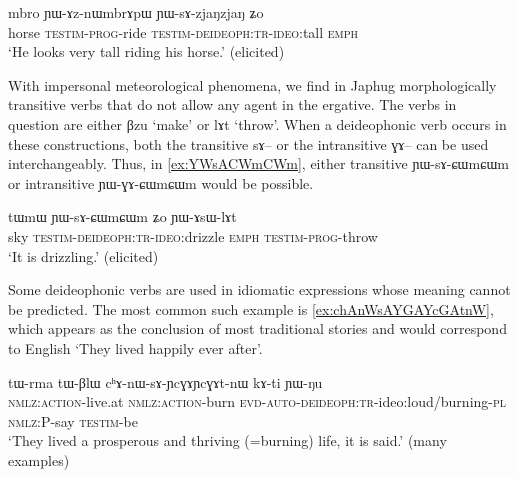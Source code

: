 \documentclass[oldfontcommands,oneside,a4paper,11pt]{article}
\newcommand{\ipa}[1]{{\phon \mbox{#1}}} %
\begin{document}
     \begin{exe}
     \ex \label{ex:YWsAzjaNzjaN2}
\gll
\ipa{mbro} 		\ipa{ɲɯ-ɤz-nɯmbrɤpɯ} \ipa{ɲɯ-sɤ-zjaŋzjaŋ} 	\ipa{ʑo} \\
horse  \textsc{testim-prog}-ride \textsc{testim-deideoph:tr-ideo}:tall \textsc{emph}\\
\glt `He looks very tall riding his horse.' (elicited)
\end{exe}

With impersonal meteorological phenomena, we find in Japhug morphologically transitive verbs that do not allow any agent in the ergative. The verbs in question are either \ipa{βzu} `make' or \ipa{lɤt} `throw'. When a deideophonic verb occurs in these constructions, both the transitive \ipa{sɤ--} or the intransitive \ipa{ɣɤ--} can be used interchangeably. Thus, in \ref{ex:YWsACWmCWm}, either transitive	\ipa{ɲɯ-sɤ-ɕɯmɕɯm} or 	intransitive \ipa{ɲɯ-ɣɤ-ɕɯmɕɯm} would be possible.

     \begin{exe}
     \ex \label{ex:YWsACWmCWm}
\gll
\ipa{tɯmɯ} 	\ipa{ɲɯ-sɤ-ɕɯmɕɯm} 	\ipa{ʑo} 	\ipa{ɲɯ-ɤsɯ-lɤt} \\
sky \textsc{testim-deideoph:tr-ideo}:drizzle \textsc{emph} \textsc{testim-prog}-throw \\
\glt `It is drizzling.' (elicited)
\end{exe}
 
Some deideophonic verbs are used in idiomatic expressions whose meaning cannot be predicted. The most common such example is \ref{ex:chAnWsAYGAYcGAtnW}, which appears as the conclusion of most traditional stories and would correspond to English `They lived happily ever after'.

     \begin{exe}
\ex \label{ex:chAnWsAYGAYcGAtnW}
\gll 
\ipa{tɯ-rma}  	\ipa{tɯ-βlɯ}  	\ipa{cʰɤ-nɯ-sɤ-ɲcɣɤɲcɣɤt-nɯ}  	\ipa{kɤ-ti}  	\ipa{ɲɯ-ŋu}  \\
\textsc{nmlz:action}-live.at \textsc{nmlz:action}-burn \textsc{evd-auto-deideoph:tr}-ideo:loud/burning-\textsc{pl} \textsc{nmlz}:P-say \textsc{testim}-be \\
\glt  `They lived a prosperous and thriving (=burning) life, it is said.' (many examples)
\end{exe}


 	  
\end{document}

